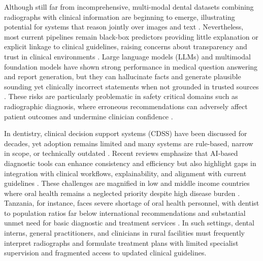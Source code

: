 \documentclass[12pt,a4paper]{report}
\begin{document}
	Although still far from incomprehensive, multi-modal dental datasets combining radiographs with clinical information are beginning to emerge, illustrating potential for systems that reason jointly over images and text \cite{huang2024multimodal_dental}. Nevertheless, most current pipelines remain black-box predictors providing little explanation or explicit linkage to clinical guidelines, raising concerns about transparency and trust in clinical environments \cite{holzinger2017we,schwendicke2022ai_global}. Large language models (LLMs) and multimodal foundation models have shown strong performance in medical question answering and report generation, but they can hallucinate facts and generate plausible sounding yet clinically incorrect statements when not grounded in trusted sources \cite{thirunavukarasu2023large,ji2023survey,chatbots_Rajesh_2024}. These risks are particularly problematic in safety critical domains such as radiographic diagnosis, where erroneous recommendations can adversely affect patient outcomes and undermine clinician confidence \cite{Rokhshad2025}.
	
	In dentistry, clinical decision support systems (CDSS) have been discussed for decades, yet adoption remains limited and many systems are rule-based, narrow in scope, or technically outdated \cite{White1996DecisionSupport,inchingolo2025ai_dentistry_review}. Recent reviews emphasize that AI-based diagnostic tools can enhance consistency and efficiency but also highlight gaps in integration with clinical workflows, explainability, and alignment with current guidelines \cite{inchingolo2025ai_dentistry_review,schwendicke2020artificial}. These challenges are magnified in low and middle income countries where oral health remains a neglected priority despite high disease burden \cite{who_oral_health,world2024global}. Tanzania, for instance, faces severe shortage of oral health personnel, with dentist to population ratios far below international recommendations and substantial unmet need for basic diagnostic and treatment services \cite{Edward2024OralHealthTZ,tanzania_oral_health_policy}. In such settings, dental interns, general practitioners, and clinicians in rural facilities must frequently interpret radiographs and formulate treatment plans with limited specialist supervision and fragmented access to updated clinical guidelines.
	
\end{document}
